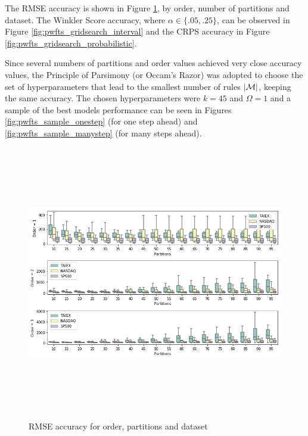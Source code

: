 The RMSE accuracy is shown in Figure \ref{fig:pwfts_gridsearch_point}, by order, number of partitions and dataset. The Winkler Score accuracy, where  $\alpha \in \{.05,.25\}$, can be observed in Figure \ref{fig:pwfts_gridsearch_interval} and the CRPS accuracy in Figure \ref{fig:pwfts_gridsearch_probabilistic}.

Since several numbers of partitions and order values achieved very close accuracy values, the Principle of Parsimony (or Occam's Razor) was adopted to choose the set of hyperparameters that lead to the smallest number of rules $|\mathcal{M}|$, keeping the same accuracy. The chosen hyperparameters were $k = 45$ and $\Omega = 1$ and a sample of the best models performance can be seen in Figures \ref{fig:pwfts_sample_onestep} (for one step ahead) and \ref{fig:pwfts_sample_manystep} (for many steps ahead).


\begin{figure}[htb]
    \centering
    \includegraphics[width=\textwidth,height=12cm]{figures/pwfts_gridsearch_point.png}
    \caption{RMSE accuracy for order, partitions and dataset}
    \label{fig:pwfts_gridsearch_point}
\end{figure}

